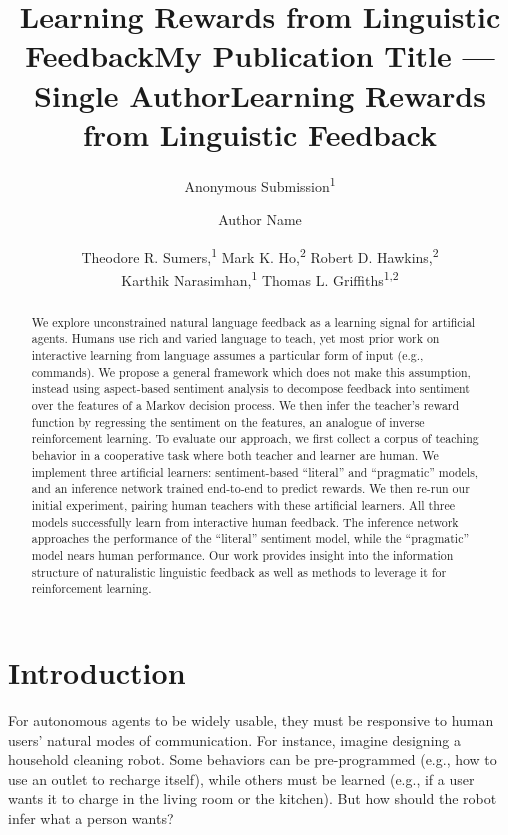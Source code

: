 \documentclass[letterpaper]{article} %
\title{Learning Rewards from Linguistic Feedback}
\author{
    Anonymous Submission\textsuperscript{\rm 1}\\
}
\title{My Publication Title --- Single Author}
\author {
    Author Name \\
}
\title{Learning Rewards from Linguistic Feedback}
\author {
    Theodore R. Sumers,\textsuperscript{\rm 1}
    Mark K. Ho,\textsuperscript{\rm 2}
    Robert D. Hawkins,\textsuperscript{\rm 2}\\
    Karthik Narasimhan,\textsuperscript{\rm 1}
    Thomas L. Griffiths\textsuperscript{\rm 1,2}\\
}
\begin{document}
\maketitle

\begin{abstract}

We explore unconstrained natural language feedback as a learning signal for artificial agents. Humans use rich and varied language to teach, yet most prior work on interactive learning from language assumes a particular form of input (e.g., commands). We propose a general framework which does not make this assumption, instead using aspect-based sentiment analysis to decompose feedback into sentiment over the features of a Markov decision process. We then infer the teacher's reward function by regressing the sentiment on the features, an analogue of inverse reinforcement learning. To evaluate our approach, we first collect a corpus of teaching behavior in a cooperative task where both teacher and learner are human. We implement three artificial learners: sentiment-based ``literal'' and ``pragmatic'' models, and an inference network trained end-to-end to predict rewards. We then re-run our initial experiment, pairing human teachers with these artificial learners. All three models successfully learn from interactive human feedback. The inference network approaches the performance of the ``literal'' sentiment model, while the ``pragmatic'' model nears human performance. Our work provides insight into the information structure of naturalistic linguistic feedback as well as methods to leverage it for reinforcement learning.

\end{abstract}

\section{Introduction}
For autonomous agents to be widely usable, they must be responsive to human users' natural modes of communication. For instance, imagine designing a household cleaning robot. Some behaviors can be pre-programmed (e.g., how to use an outlet to recharge itself), while others must be learned (e.g., if a user wants it to charge in the living room or the kitchen). But how should the robot infer what a person wants?
\end{document}
